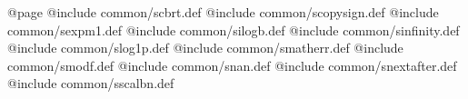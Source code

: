@page
@include common/scbrt.def
@include common/scopysign.def
@include common/sexpm1.def
@include common/silogb.def
@include common/sinfinity.def
@include common/slog1p.def
@include common/smatherr.def
@include common/smodf.def
@include common/snan.def
@include common/snextafter.def
@include common/sscalbn.def
